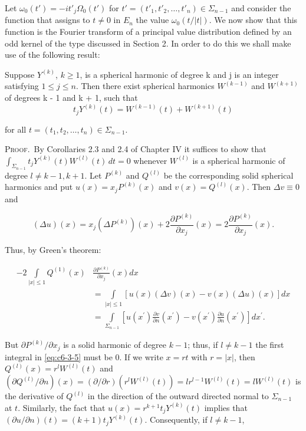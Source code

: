 Let $\omega_0(t') = -it'_j\Omega_0(t')$ for $t' = (t'_1, t'_2, \ldots, t'_n) \in \Sigma_{n-1}$ and consider the function that assigns to $t \neq 0$ in $E_n$ the value $\omega_0(t/|t|)$. We now show that this function is the Fourier transform of a principal value distribution defined by an odd kernel of the type discussed in Section 2. In order to do this we shall make use of the following result:

\begin{lemma}
\label{lem:c6-3-4}
Suppose $Y^{(k)}$, $k \geq 1$, is a spherical harmonic of degree k and j is an integer satisfying $1 \leq j \leq n$. Then there exist spherical harmonics $W^{(k-1)}$ and $W^{(k+1)}$ of degrees k - 1 and k + 1, such that
\[
t_{j}Y^{(k)}(t)=W^{(k-1)}(t)+W^{(k+1)}(t)
\]

for all $t = (t_1, t_2, \ldots, t_n) \in \Sigma_{n-1}$.
\end{lemma}

\textsc{Proof.}\ By Corollaries 2.3 and 2.4 of Chapter IV it suffices to show that $\int_{\Sigma_{n-1}} t_j Y^{(k)}(t) W^{(l)}(t) \, dt = 0$ whenever $W^{(l)}$ is a spherical harmonic of degree $l \neq k - 1, k + 1$. Let $P^{(k)}$ and $Q^{(l)}$ be the corresponding solid spherical harmonics and put $u(x) = x_j P^{(k)}(x)$ and $v(x) = Q^{(l)}(x)$. Then $\Delta v \equiv 0$ and

\[
(\Delta u)(x)=x_{j}(\Delta P^{(k)})(x)+2\frac{\partial P^{(k)}}{\partial x_{j}}\left(x\right)=2\frac{\partial P^{(k)}}{\partial x_{j}}\left(x\right).
\]

Thus, by Green's theorem:

\begin{equation}\label{eq:c6-3-5}
\begin{aligned}-2\int\limits_{|x|\leq1}Q^{(1)}(x)&\frac{\partial P^{(k)}}{\partial x_{j}}\left(x\right)dx\\&=\int\limits_{|x|\leq1}\left[u(x)(\Delta v)(x)-v(x)(\Delta u)(x)\right]dx\\&=\int\limits_{\Sigma_{n-1}}\left[u(x^{\prime})\frac{\partial v}{\partial n}\left(x^{\prime}\right)-v(x^{\prime})\frac{\partial u}{\partial n}\left(x^{\prime}\right)\right]dx^{\prime}.\end{aligned}
\end{equation}

But $\partial P^{(k)}/\partial x_j$ is a solid harmonic of degree $k-1$; thus, if $l \neq k-1$ the first integral in \eqref{eq:c6-3-5} must be 0. If we write $x = rt$ with $r = |x|$, then $Q^{(l)}(x) = r^l W^{(l)}(t)$ and $(\partial Q^{(l)}/\partial n)(x) = (\partial/\partial r)(r^l W^{(l)}(t)) = lr^{l-1}W^{(l)}(t) = lW^{(l)}(t)$ is the derivative of $Q^{(l)}$ in the direction of the outward directed normal to $\Sigma_{n-1}$ at $t$. Similarly, the fact that $u(x) = r^{k+1}t_j Y^{(k)}(t)$ implies that $(\partial u/\partial n)(t) = (k+1)t_j Y^{(k)}(t)$. Consequently, if $l \neq k-1$,

